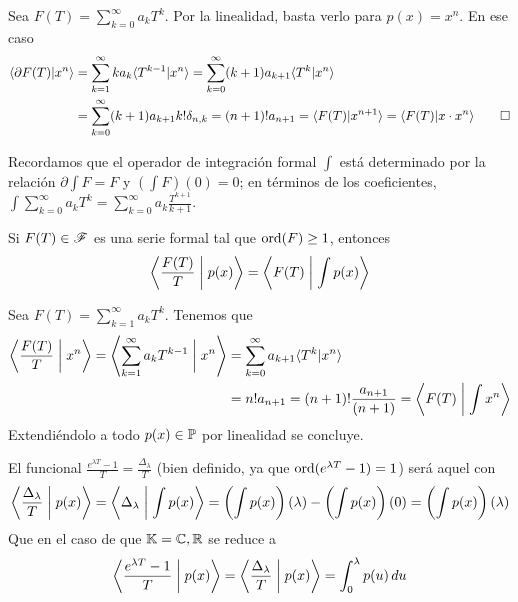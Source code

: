 \begin{demo}
    Sea $F(T) = \sum_{k=0}^\infty a_k T^k$. Por la linealidad, basta verlo para $p(x) = x^n$. En ese caso 
        \begin{align*}
            \langle \partial F(T)| x^n\rangle & = \sum_{k=1}^\infty ka_k\langle T^{k-1}| x^n\rangle = \sum_{k=0}^\infty (k+1)a_{k+1}\langle T^{k}| x^n\rangle \\
            & = \sum_{k=0}^\infty (k+1)a_{k+1}k! \delta_{n,k} = (n+1)!a_{n+1} = \langle F(T)| x^{n+1}\rangle = \langle F(T)| x\cdot x^n\rangle \qedhere
        \end{align*}
\end{demo}
    

Recordamos que el operador de integración formal $\int$ está determinado por la relación $\partial \int F = F$ y $(\int F)(0) = 0$; en términos de los coeficientes, $\int \sum_{k=0}^{\infty} a_{k} T^{k} = \sum_{k=0}^{\infty} a_{k} \frac{T^{k+1}}{k+1}$.
	
	
\begin{proposicion}\label{adjuncion operador integral}
    Si $F(T) \in \mathscr{F}$ es una serie formal tal que $\operatorname*{ord}(F) \geq 1$, entonces
    \begin{equation*}
        \left\langle \frac{F(T)}{T} \biggm| p(x) \right\rangle = \left\langle F(T) \biggm| \int p(x) \right\rangle
    \end{equation*}
\end{proposicion}

\begin{demo}
    Sea $F(T) = \sum_{k=1}^\infty a_kT^k$. Tenemos que
    \begin{align*}
           \left\langle \frac{F(T)}{T} \biggm| x^n \right\rangle
		 = \left\langle \sum_{k=1}^\infty a_kT^{k-1} \biggm| x^n \right\rangle
		&= \sum_{k=0}^\infty a_{k+1} \langle T^{k}| x^n \rangle 
		\\
		&= n! a_{n+1} 
		 = (n+1)!\frac{a_{n+1}}{(n+1)} 
		 = \left\langle F(T) \biggm| \int x^n \right\rangle
    \end{align*}
    Extendiéndolo a todo $p(x) \in \mathbb{P}$ por linealidad se concluye.
\end{demo}
    
\begin{ej}
    El funcional $\frac{e^{\lambda T} -1}{T} = \frac{\Delta_\lambda}{T}$ (bien definido, ya que $\operatorname*{ord}(e^{\lambda T} - 1) = 1$) será aquel con
    \begin{equation*}
        \left\langle \frac{\Delta_{\lambda}}{T} \biggm| p(x) \right\rangle = \left\langle \Delta_\lambda \biggm| \int p(x) \right\rangle = \left( \int p(x) \right)(\lambda) - \left( \int p(x) \right)(0) = \left( \int p(x) \right)(\lambda)
    \end{equation*}
    Que en el caso de que $\mathbb{K} = \mathbb{C}, \mathbb{R}$ se reduce a
    \begin{equation} \label{funcional Bernoulli}
        \left\langle \frac{e^{\lambda T} -1}{T} \biggm| p(x) \right\rangle = \left\langle \frac{\Delta_\lambda}{T} \biggm| p(x) \right\rangle = \int_{0}^{\lambda} p(u) \, du
    \end{equation}
\end{ej}

